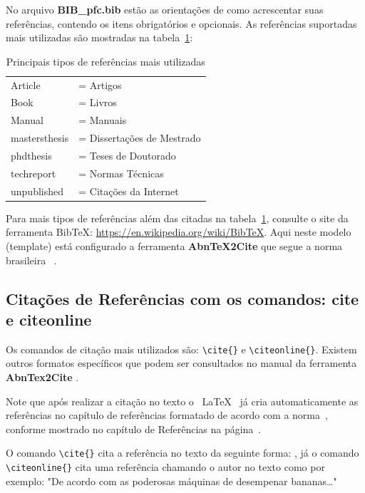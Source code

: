 No arquivo {\bf BIB\_pfc.bib} estão as orientações de como acrescentar suas referências, contendo os itens obrigatórios e opcionais. As referências suportadas mais utilizadas são mostradas na tabela~\ref{tab:Tipos_Ref}: 
    
\begin{table}[htb]
    \centering
    \caption{Principais tipos de referências mais utilizadas}
    \begin{tabular}{ll}
        \toprule
        Article         & = Artigos \\
        Book            & = Livros \\
        Manual          & = Manuais \\
        mastersthesis   & = Dissertações de Mestrado \\
        phdthesis       & = Teses de Doutorado \\
        techreport      & = Normas Técnicas \\
        unpublished     & = Citações da Internet\\
        \bottomrule
    \end{tabular}        
    \label{tab:Tipos_Ref}
\end{table}
    
 Para  mais tipos de referências além das citadas na tabela~\ref{tab:Tipos_Ref}, consulte o site da ferramenta BibTeX: \url{https://en.wikipedia.org/wiki/BibTeX}. 
Aqui neste modelo (template) está configurado a ferramenta {\bf AbnTeX2Cite} \cite{AbnTeX2Cite} que segue a norma brasileira ~.


\subsection{Citações de Referências com os comandos: cite e  citeonline}

Os comandos de citação mais utilizados são: \verb|\cite{}| e  \verb|\citeonline{}|. Existem outros formatos específicos que podem ser consultados no manual da ferramenta {\bf AbnTex2Cite} \cite{AbnTeX2Cite}.

Note que após realizar a citação no texto o ~\LaTeX~ já cria automaticamente as referências no capítulo de referências formatado de acordo com a norma~, conforme mostrado no capítulo de Referências na página~\pageref{cap:RefBib}.


O comando \verb|\cite{}| cita a referência no texto da seguinte forma: \cite{ApelidoArtigo}, já o comando \verb|\citeonline{}| cita uma referência chamando o autor no texto como por exemplo: "De acordo com  as poderosas máquinas de desempenar bananas\ldots"

